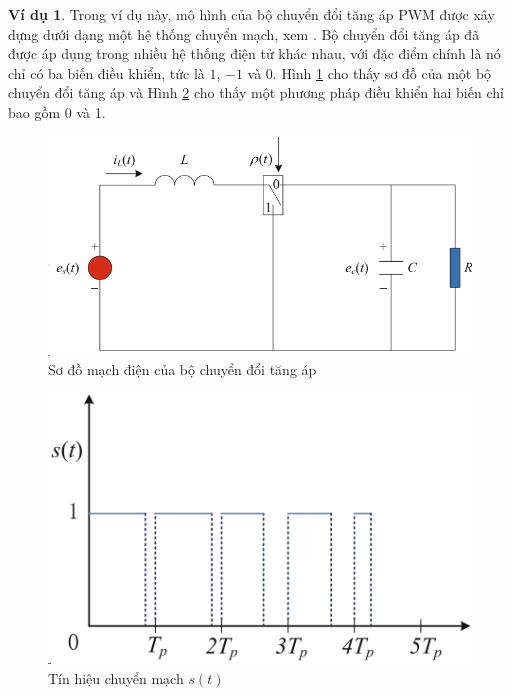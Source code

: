 \documentclass[12pt,a4paper]{report}
\theoremstyle{definition}
\newtheorem{vd}{Ví dụ}
\theoremstyle{definition}
\numberwithin{dl}{chapter}
\numberwithin{vd}{chapter}
\numberwithin{corollary}{chapter}
\numberwithin{lemma}{chapter}
\numberwithin{md}{chapter}
\numberwithin{dn}{chapter}
\numberwithin{cy}{chapter}
\numberwithin{nx}{chapter}
\begin{document}
\begin{vd}
Trong ví dụ này, mô hình của bộ chuyển đổi tăng áp PWM được xây dựng dưới dạng một hệ thống chuyển mạch, xem \cite{book1}. Bộ chuyển đổi tăng áp đã được áp dụng trong nhiều hệ thống điện tử khác nhau, với đặc điểm chính là nó chỉ có ba biến điều khiển, tức là $1$, $-1$ và $0$. Hình \ref{fig:screenshot005} cho thấy sơ đồ của một bộ chuyển đổi tăng áp và Hình \ref{fig:screenshot006} cho thấy một phương pháp điều khiển hai biến chỉ bao gồm 0 và 1. 

\begin{figure}[h!]
	\centering
	\includegraphics[width=0.8\linewidth]{screenshot005}
	\caption{Sơ đồ mạch điện của bộ chuyển đổi tăng áp}
	\label{fig:screenshot005}
\end{figure}

\begin{figure}[h!]
	\centering
	\includegraphics[width=0.8\linewidth]{screenshot006}
	\caption{Tín hiệu chuyển mạch $s(t)$}
	\label{fig:screenshot006}
\end{figure}


\end{vd}
\end{document}

